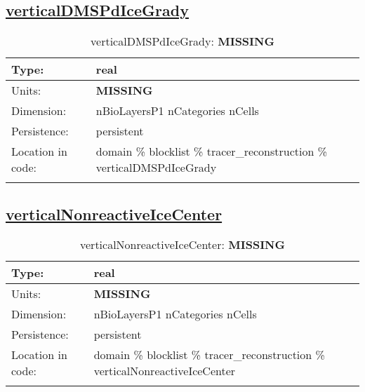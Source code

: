 \subsection[verticalDMSPdIceGrady]{\hyperref[sec:var_tab_tracer_reconstruction]{verticalDMSPdIceGrady}}
\label{subsec:var_sec_tracer_reconstruction_verticalDMSPdIceGrady}
\begin{center}
\begin{longtable}{| p{2.0in} | p{4.0in} |}
        \hline 
        Type: & real \\
        \hline 
        Units: & {\bf \color{red} MISSING} \\
        \hline 
        Dimension: & nBioLayersP1 nCategories nCells \\
        \hline 
        Persistence: & persistent \\
        \hline 
         Location in code: & domain \% blocklist \% tracer\_reconstruction \% verticalDMSPdIceGrady \\
         \hline 
    \caption{verticalDMSPdIceGrady: {\bf \color{red} MISSING}}
\end{longtable}
\end{center}
\subsection[verticalNonreactiveIceCenter]{\hyperref[sec:var_tab_tracer_reconstruction]{verticalNonreactiveIceCenter}}
\label{subsec:var_sec_tracer_reconstruction_verticalNonreactiveIceCenter}
\begin{center}
\begin{longtable}{| p{2.0in} | p{4.0in} |}
        \hline 
        Type: & real \\
        \hline 
        Units: & {\bf \color{red} MISSING} \\
        \hline 
        Dimension: & nBioLayersP1 nCategories nCells \\
        \hline 
        Persistence: & persistent \\
        \hline 
         Location in code: & domain \% blocklist \% tracer\_reconstruction \% verticalNonreactiveIceCenter \\
         \hline 
    \caption{verticalNonreactiveIceCenter: {\bf \color{red} MISSING}}
\end{longtable}
\end{center}
